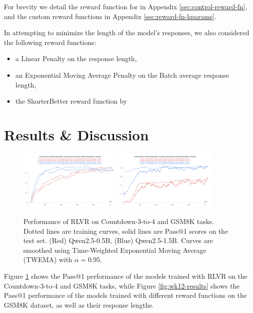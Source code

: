 \documentclass{article} %
\theoremstyle{definition}
\begin{document}
For brevity we detail the reward function for \cite{wk10} in Appendix \ref{sec:control-reward-fn},
and the custom reward functions in Appendix \ref{sec:reward-fn-hparams}.

In attempting to minimize the length of the model's responses,
we also considered the following reward functions:
\begin{itemize}
    \item a Linear Penalty on the response length,
    \item an Exponential Moving Average Penalty on the Batch average response length,
    \item the ShorterBetter reward function by \cite{ShorterBetter}
\end{itemize}

\section{Results \& Discussion}

\begin{figure}
    \centering
    \includegraphics[width=0.45\textwidth,height=0.175\textheight]{images/Countdown.png}
    \includegraphics[width=0.45\textwidth,height=0.175\textheight]{images/GSM8K.png}
    \caption{
        Performance of RLVR on Countdown-3-to-4 and GSM8K tasks. 
        Dotted lines are training curves,
        solid lines are Pass@1 scores on the test set.
        (Red) Qwen2.5-0.5B, (Blue) Qwen2.5-1.5B.
        Curves are smoothed using Time-Weighted Exponential Moving Average (TWEMA) with $\alpha = 0.95$.
    }
    \label{fig:wk10-results}
\end{figure} 
Figure \ref{fig:wk10-results} shows the Pass@1 performance of the models trained with RLVR on the Countdown-3-to-4 and GSM8K tasks,
while Figure \ref{fig:wk12-results} shows the Pass@1 performance of the models trained with 
different reward functions on the GSM8K dataset, as well as their response lengths.
\end{document}
